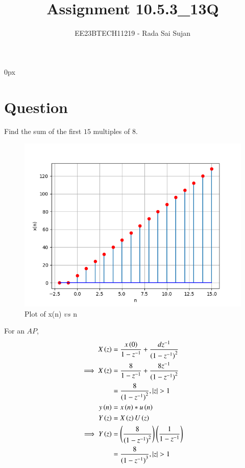 \documentclass[journal,12pt,twocolumn]{IEEEtran}
\theoremstyle{remark}
\begin{document}
\parindent 0px

\title{Assignment 10.5.3\_13Q}
\author{EE23BTECH11219 - Rada Sai Sujan$^{}$%
}
\maketitle
\newpage
\bigskip
\section*{Question}
Find the sum of the first $15$ multiples of $8$. \\
\solution

    \begin{figure}[ht]
        \centering
        \includegraphics[width=\columnwidth]{figs/a.png}
        \caption{Plot of x(n) $vs$ n}
        \label{fig:10.5.3.13.1}
    \end{figure}
For an $AP$,
\begin{align}
    X\left(z\right) &= \frac{ x\left(0\right) }{1-z^{-1}} + \frac{dz^{-1}}{{(1-z^{-1})}^{2}}    \\
    \implies X\left(z\right) &= \frac{8}{1-z^{-1}} + \frac{8z^{-1}}{{(1-z^{-1})}^{2}} \\
    &= \frac{8}{({1-z^{-1})}^{2}} , \left\vert z\right\vert>1    \\
    y\left(n\right)&=x\left(n\right)\ast u\left(n\right)\\
    Y\left(z\right)&=X\left(z\right)U\left(z\right)   \\
    \implies Y\left(z\right)&=\left(\frac{8}{({1-z^{-1})}^{2}}\right)\left(\frac{1}{1-z^{-1}}\right)  \\
    &=\frac{8}{({1-z^{-1})}^{3}} , \left\vert z\right\vert>1 
 \end{align}
\end{document}
